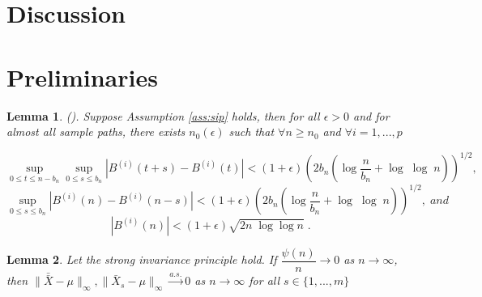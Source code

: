 \documentclass[12pt]{article}
\newtheorem{lemma}{Lemma}
\theoremstyle{remark}
\begin{document}
\section{Discussion} \label{sec:discussion}


\appendix

\section{Preliminaries} \label{apdx:preliminaries}

\begin{lemma}
\label{lemma: brownian}
(\cite{csorgo2014strong}). Suppose Assumption \ref{ass:sip} holds, then for all $\epsilon > 0$ and for almost all sample paths, there exists $n_{0}\left(\epsilon\right)$ such that $\forall n\geq n_{0}$ and $\forall i = 1, ..., p$

\[
\sup_{0\leq t \leq n-b_n}\sup_{0 \leq s \leq b_n} \left| B^{\left(i\right)}\left(t+s\right) - B^{\left(i\right)}\left(t\right) \right| < \left(1+ \epsilon\right)\left(2b_n\left(\log\dfrac{n}{b_n} + \log\; \log\; n\right)\right)^{1/2} ,
\]
%
\[
\sup_{0 \leq s \leq b_n} \left|B^{\left(i\right)}\left(n\right) - B^{\left(i\right)}\left(n - s\right)\right| < \left(1+ \epsilon\right)\left(2b_n\left(\log\dfrac{n}{b_n} + \log\;\log\;n\right)\right)^{1/2} , \;and
\]
%
\[
\left|B^{\left(i\right)}\left(n\right)\right| < \left(1+\epsilon\right)\sqrt{2n\;\log \log n} \; . 
\]
\end{lemma}


\begin{lemma} \label{lemma:consis_1}
  Let the strong invariance principle hold. If $\dfrac{\psi(n)}{n} \to 0$ as $n \to \infty$, then $\| \bar{\bar{X}} - \mu\|_{\infty}, \|\bar{X}_s - \mu\|_{\infty} \xrightarrow[]{a.s.} 0$ as $n \to \infty$ for all $s \in \{1,..., m\}$\\
  \end{lemma}
\end{document}
